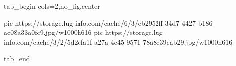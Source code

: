  
 
 
 
 


\ifcmt
  tab_begin cols=2,no_fig,center

     pic https://storage.lug-info.com/cache/6/3/eb2952ff-34d7-4427-b186-ae08a33a0fe9.jpg/w1000h616%
		 pic https://storage.lug-info.com/cache/3/2/5d2efa1f-a27a-4c45-9571-78a8c39cab29.jpg/w1000h616%

  tab_end
\fi

